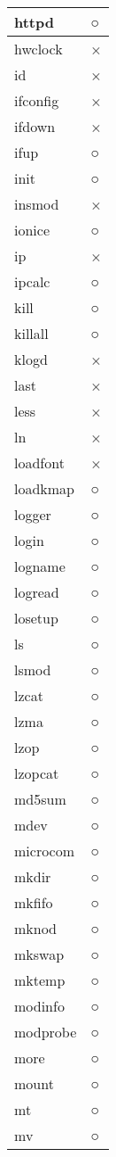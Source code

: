 \begin{longtable}{p{60mm}p{60mm}}
httpd & ○ \\ \hline
hwclock & × \\ \hline
id & × \\ \hline
ifconfig & × \\ \hline
ifdown & × \\ \hline
ifup & ○ \\ \hline
init & ○ \\ \hline
insmod & × \\ \hline
ionice & ○ \\ \hline
ip & × \\ \hline
ipcalc & ○ \\ \hline
kill & ○ \\ \hline
killall & ○ \\ \hline
klogd & × \\ \hline
last & × \\ \hline
less & × \\ \hline
ln & × \\ \hline
loadfont & × \\ \hline
loadkmap & ○ \\ \hline
logger & ○ \\ \hline
login & ○ \\ \hline
logname & ○ \\ \hline
logread & ○ \\ \hline
losetup & ○ \\ \hline
ls & ○ \\ \hline
lsmod & ○ \\ \hline
lzcat & ○ \\ \hline
lzma & ○ \\ \hline
lzop & ○ \\ \hline
lzopcat & ○ \\ \hline
md5sum & ○ \\ \hline
mdev & ○ \\ \hline
microcom & ○ \\ \hline
mkdir & ○ \\ \hline
mkfifo & ○ \\ \hline
mknod & ○ \\ \hline
mkswap & ○ \\ \hline
mktemp & ○ \\ \hline
modinfo & ○ \\ \hline
modprobe & ○ \\ \hline
more & ○ \\ \hline
mount & ○ \\ \hline
mt & ○ \\ \hline
mv & ○ \\ \hline

\end{longtable}
